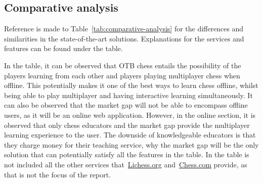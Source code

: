 \subsection{Comparative analysis}\label{subsec:comparative-analysis}

Reference is made to Table~\ref{tab:comparative-analysis} for the differences and similarities in the state-of-the-art
solutions.
Explanations for the services and features can be found under the table.

In the table, it can be observed that OTB chess entails the possibility of the players learning from each other and
players playing multiplayer chess when offline.
This potentially makes it one of the best ways to learn chess offline, whilst being able to play multiplayer and having
interactive learning simultaneously.
It can also be observed that the market gap will not be able to encompass offline users, as it will be an online web
application.
However, in the online section, it is observed that only chess educators and the market gap provide the multiplayer
learning experience to the user.
The downside of knowledgeable educators is that they charge money for their teaching service, why the market gap will be
the only solution that can potentially satisfy all the features in the table.
In the table is not included all the other services that~\url{Lichess.org} and~\url{Chess.com} provide, as that is not
the focus of the report.

